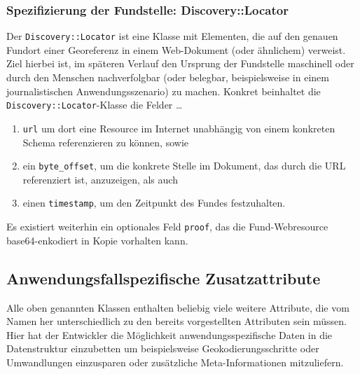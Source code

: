 \subsubsection{Spezifizierung der Fundstelle: Discovery::Locator}
Der \texttt{Discovery::Locator} ist eine Klasse mit Elementen, die auf den genauen Fundort einer Georeferenz in einem Web-Dokument (oder ähnlichem) verweist. Ziel hierbei ist, im späteren Verlauf den Ursprung der Fundstelle maschinell oder durch den Menschen nachverfolgbar (oder belegbar, beispielsweise in einem journalistischen Anwendungsszenario) zu machen. Konkret beinhaltet die \texttt{Discovery::Locator}-Klasse die Felder \ldots

\begin{enumerate}
  \item{\texttt{url} um dort eine Resource im Internet unabhängig von einem konkreten Schema referenzieren zu können, sowie}
  \item{ein \texttt{byte\_offset}, um die konkrete Stelle im Dokument, das durch die URL referenziert ist, anzuzeigen, als auch}
  \item{einen \texttt{timestamp}, um den Zeitpunkt des Fundes festzuhalten.}
\end{enumerate}
  
Es existiert weiterhin ein optionales Feld \texttt{proof}, das die Fund-Webresource base64-enkodiert in Kopie vorhalten kann.

\subsection{Anwendungsfallspezifische Zusatzattribute}

Alle oben genannten Klassen enthalten beliebig viele weitere Attribute, die vom Namen her unterschiedlich zu den bereits vorgestellten Attributen sein müssen. Hier hat der Entwickler die Möglichkeit anwendungsspezifische Daten in die Datenstruktur einzubetten um beispielsweise Geokodierungsschritte oder Umwandlungen einzusparen oder zusätzliche Meta-Informationen mitzuliefern.

